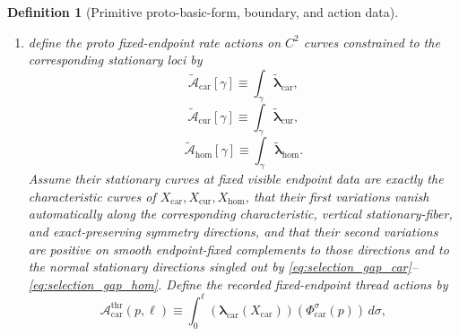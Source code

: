 \documentclass[11pt]{article}
\newcommand{\TensorFlowField}{X_{\mathrm{car}}}
\newcommand{\CurFlowField}{X_{\mathrm{cur}}}
\newcommand{\HomFlowField}{X_{\mathrm{hom}}}
\newcommand{\TensorOrbitFlow}{\Phi_{\mathrm{car}}}
\newcommand{\CurOrbitFlow}{\Phi_{\mathrm{cur}}}
\newcommand{\HomOrbitFlow}{\Phi_{\mathrm{hom}}}
\newcommand{\CurProcLength}{L_{\mathrm{cur}}}
\newcommand{\HomProcLength}{L_{\mathrm{hom}}}
\newcommand{\TensorRateForm}{\boldsymbol{\lambda}_{\mathrm{car}}}
\newcommand{\TensorBoundarySource}{\boldsymbol{\rho}_{\mathrm{car}}^{\partial}}
\newcommand{\CurBoundarySource}{\boldsymbol{\rho}_{\mathrm{cur}}^{\partial}}
\newcommand{\HomBoundarySource}{\boldsymbol{\rho}_{\mathrm{hom}}^{\partial}}
\newcommand{\TensorThreadAction}{\mathscr A_{\mathrm{car}}^{\mathrm{thr}}}
\newcommand{\TensorProtoRateForm}{\widetilde{\boldsymbol{\lambda}}_{\mathrm{car}}}
\newcommand{\CurProtoRateForm}{\widetilde{\boldsymbol{\lambda}}_{\mathrm{cur}}}
\newcommand{\HomProtoRateForm}{\widetilde{\boldsymbol{\lambda}}_{\mathrm{hom}}}
\newcommand{\TensorProtoAction}{\widetilde{\mathscr A}_{\mathrm{car}}}
\newcommand{\CurProtoAction}{\widetilde{\mathscr A}_{\mathrm{cur}}}
\newcommand{\HomProtoAction}{\widetilde{\mathscr A}_{\mathrm{hom}}}
\newtheorem{definition}{Definition}
\begin{document}
\begin{definition}[Primitive proto-basic-form, boundary, and action data]
\begin{enumerate}
\begin{equation}
    \equiv
    \inf\left\{
    \ell>0\,\middle|\,
    \TensorBoundarySource(\TensorOrbitFlow^\ell(p))=0
    \right\},
    \label{eq:length_from_boundary_car}
    \end{equation}
    \begin{equation}
    \CurProcLength(q)
    \equiv
    \inf\left\{
    \ell>0\,\middle|\,
    \CurBoundarySource(\CurOrbitFlow^\ell(q))=0
    \right\},
    \label{eq:length_from_boundary_cur}
    \end{equation}
    \begin{equation}
    \HomProcLength(r)
    \equiv
    \inf\left\{
    \ell>0\,\middle|\,
    \HomBoundarySource(\HomOrbitFlow^\ell(r))=0
    \right\}.
    \label{eq:length_from_boundary_hom}
    \end{equation}
    \item define the proto fixed-endpoint rate actions on \(C^2\) curves constrained to the corresponding stationary loci by
    \begin{equation}
    \TensorProtoAction[\gamma]
    \equiv
    \int_\gamma \TensorProtoRateForm,
    \label{eq:proto_action_car}
    \end{equation}
    \begin{equation}
    \CurProtoAction[\gamma]
    \equiv
    \int_\gamma \CurProtoRateForm,
    \label{eq:proto_action_cur}
    \end{equation}
    \begin{equation}
    \HomProtoAction[\gamma]
    \equiv
    \int_\gamma \HomProtoRateForm.
    \label{eq:proto_action_hom}
    \end{equation}
    Assume their stationary curves at fixed visible endpoint data are exactly the characteristic curves of \(\TensorFlowField,\CurFlowField,\HomFlowField\), that their first variations vanish automatically along the corresponding characteristic, vertical stationary-fiber, and exact-preserving symmetry directions, and that their second variations are positive on smooth endpoint-fixed complements to those directions and to the normal stationary directions singled out by \eqref{eq:selection_gap_car}--\eqref{eq:selection_gap_hom}. Define the recorded fixed-endpoint thread actions by
    \begin{equation}
    \TensorThreadAction(p,\ell)
    \equiv
    \int_0^\ell \left(\TensorRateForm(\TensorFlowField)\right)(\TensorOrbitFlow^\sigma(p))\,d\sigma,
    \label{eq:thread_action_from_proto_car}
    \end{equation}
    \begin{equation}

\end{equation}
\end{enumerate}
\end{definition}
\end{document}
